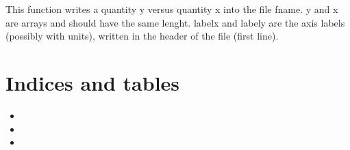 \documentclass[letterpaper,10pt,english]{sphinxmanual}
\begin{document}

\begin{fulllineitems}
\label{pyqha:pyqha.write.write_thermo}
\end{fulllineitems}


\begin{fulllineitems}
\label{pyqha:pyqha.write.write_xy}
This function writes a quantity y versus quantity x into the file fname.
y and x are arrays and should have the same lenght. labelx and labely
are the axis labels (possibly with units), written in the header of the file
(first line).

\end{fulllineitems}



\chapter{Indices and tables}
\label{index:indices-and-tables}\begin{itemize}
\item {} 

\item {} 

\item {} 

\end{itemize}
\end{document}
